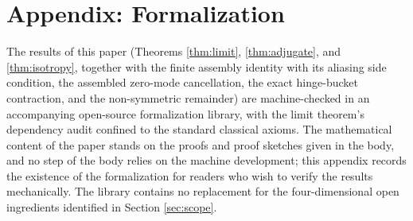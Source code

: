 \documentclass[11pt]{article}
\theoremstyle{definition}
\theoremstyle{remark}
\begin{document}
\appendix

\section{Appendix: Formalization}
\label{app:formal}

The results of this paper (Theorems \ref{thm:limit}, \ref{thm:adjugate}, and \ref{thm:isotropy}, together with the finite assembly identity with its aliasing side condition, the assembled zero-mode cancellation, the exact hinge-bucket contraction, and the non-symmetric remainder) are machine-checked in an accompanying open-source formalization library, with the limit theorem's dependency audit confined to the standard classical axioms. The mathematical content of the paper stands on the proofs and proof sketches given in the body, and no step of the body relies on the machine development; this appendix records the existence of the formalization for readers who wish to verify the results mechanically. The library contains no replacement for the four-dimensional open ingredients identified in Section \ref{sec:scope}.
\end{document}
